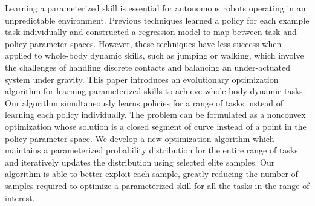 Learning a parameterized skill is essential for autonomous robots
operating in an unpredictable environment. Previous techniques learned
a policy for each example task individually and constructed a
regression model to map between task and policy parameter
spaces. However, these techniques have less success when applied to
whole-body dynamic skills, such as jumping or walking, which involve
the challenges of handling discrete contacts and balancing an
under-actuated system under gravity. This paper introduces an
evolutionary optimization algorithm for learning parameterized skills
to achieve whole-body dynamic tasks. Our algorithm simultaneously
learns policies for a range of tasks instead of learning each
policy individually. The problem can be formulated as a nonconvex
optimization whose solution is a closed segment of curve instead of a
point in the policy parameter space. We develop a new optimization
algorithm which maintains a parameterized probability distribution for
the entire range of tasks and iteratively updates the distribution
using selected elite samples. Our algorithm is able to better exploit
each sample, greatly reducing the number of samples required to
optimize a parameterized skill for all the tasks in the range of
interest.
